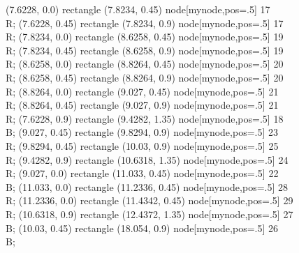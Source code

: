  (7.6228, 0.0) rectangle (7.8234, 0.45) node[mynode,pos=.5] {17 \\ R};
 (7.6228, 0.45) rectangle (7.8234, 0.9) node[mynode,pos=.5] {17 \\ R};
 (7.8234, 0.0) rectangle (8.6258, 0.45) node[mynode,pos=.5] {19 \\ R};
 (7.8234, 0.45) rectangle (8.6258, 0.9) node[mynode,pos=.5] {19 \\ R};
 (8.6258, 0.0) rectangle (8.8264, 0.45) node[mynode,pos=.5] {20 \\ R};
 (8.6258, 0.45) rectangle (8.8264, 0.9) node[mynode,pos=.5] {20 \\ R};
 (8.8264, 0.0) rectangle (9.027, 0.45) node[mynode,pos=.5] {21 \\ R};
 (8.8264, 0.45) rectangle (9.027, 0.9) node[mynode,pos=.5] {21 \\ R};
 (7.6228, 0.9) rectangle (9.4282, 1.35) node[mynode,pos=.5] {18 \\ B};
 (9.027, 0.45) rectangle (9.8294, 0.9) node[mynode,pos=.5] {23 \\ R};
 (9.8294, 0.45) rectangle (10.03, 0.9) node[mynode,pos=.5] {25 \\ R};
 (9.4282, 0.9) rectangle (10.6318, 1.35) node[mynode,pos=.5] {24 \\ R};
 (9.027, 0.0) rectangle (11.033, 0.45) node[mynode,pos=.5] {22 \\ B};
 (11.033, 0.0) rectangle (11.2336, 0.45) node[mynode,pos=.5] {28 \\ R};
 (11.2336, 0.0) rectangle (11.4342, 0.45) node[mynode,pos=.5] {29 \\ R};
 (10.6318, 0.9) rectangle (12.4372, 1.35) node[mynode,pos=.5] {27 \\ B};
 (10.03, 0.45) rectangle (18.054, 0.9) node[mynode,pos=.5] {26 \\ B};
